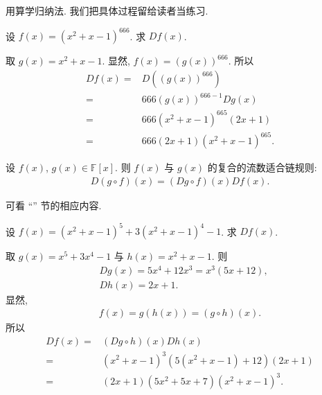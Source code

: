 \begin{pf}
    用算学归纳法. 我们把具体过程留给读者当练习.
\end{pf}

\begin{example}
    设 $f(x) = (x^2 + x - 1)^{666}$. 求 $Df(x)$.

    取 $g(x) = x^2 + x - 1$. 显然, $f(x) = (g(x))^{666}$. 所以
    \begin{align*}
        Df(x)
        = {} & D((g(x))^{666})                   \\
        = {} & 666 (g(x))^{666 - 1} Dg(x)        \\
        = {} & 666 (x^2 + x - 1)^{665} (2x + 1)  \\
        = {} & 666 (2x + 1) (x^2 + x - 1)^{665}.
    \end{align*}
\end{example}

\begin{proposition}
    设 $f(x)$, $g(x) \in \mathbb{F}[x]$. 则 $f(x)$ 与 $g(x)$ 的复合的流数适合链规则:
    \begin{align*}
        D(g \circ f) (x) = (Dg \circ f)(x) Df (x).
    \end{align*}
\end{proposition}

\begin{pf}
    可看 ``\Fluxions'' 节的相应内容.
\end{pf}

\begin{example}
    设 $f(x) = (x^2 + x - 1)^5 + 3 (x^2 + x - 1)^4 - 1$. 求 $Df(x)$.

    取 $g(x) = x^5 + 3x^4 - 1$ 与 $h(x) = x^2 + x - 1$. 则
    \begin{align*}
         & Dg(x) = 5x^4 + 12x^3 = x^3 (5x + 12), \\
         & Dh(x) = 2x + 1.
    \end{align*}
    显然,
    \begin{align*}
        f(x) = g(h(x)) = (g \circ h) (x).
    \end{align*}
    所以
    \begin{align*}
        Df(x)
        = {} & (Dg \circ h)(x) Dh(x)                          \\
        = {} & (x^2 + x - 1)^3 (5(x^2 + x - 1) + 12) (2x + 1) \\
        = {} & (2x + 1) (5x^2 + 5x + 7) (x^2 + x - 1)^3.
    \end{align*}
\end{example}
